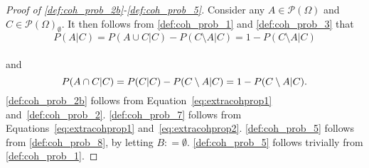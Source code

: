 \documentclass[10pt,a4paper]{paper}
\theoremstyle{definition}
\newcommand{\paths}{\Omega}
\newcommand{\power}{\mathcal{P}(\paths)}
\newcommand{\nonemptypower}{\power_{\emptyset}}
\newcommand{\coloneqq}{:\!=}
\begin{document}
\begin{proof}[Proof of \ref{def:coh_prob_2b}-\ref{def:coh_prob_5}]
Consider any $A\in\power$ and $C\in\nonemptypower$. It then follows from \ref{def:coh_prob_1} and \ref{def:coh_prob_3} that
\vspace{-7pt}
\begin{equation}\label{eq:extracohprop1}
P(A\vert C)
=P(A\cup C\vert C)-P(C\setminus A\vert C)
=1-P(C\setminus A\vert C)
\end{equation}\\[-20pt]
and
\begin{equation}\label{eq:extracohprop2}
P(A\cap C\vert C)
=P(C\vert C)-P(C\setminus A\vert C)
=1-P(C\setminus A\vert C).
\vspace{6pt}
\end{equation}
\ref{def:coh_prob_2b} follows from Equation~\eqref{eq:extracohprop1} and~\ref{def:coh_prob_2}. \ref{def:coh_prob_7} follows from Equations~\eqref{eq:extracohprop1} and~\eqref{eq:extracohprop2}. \ref{def:coh_prob_5} follows from \ref{def:coh_prob_8}, by letting $B\coloneqq\emptyset$. \ref{def:coh_prob_5} follows trivially from \ref{def:coh_prob_1}.
\end{proof}
\end{document}
